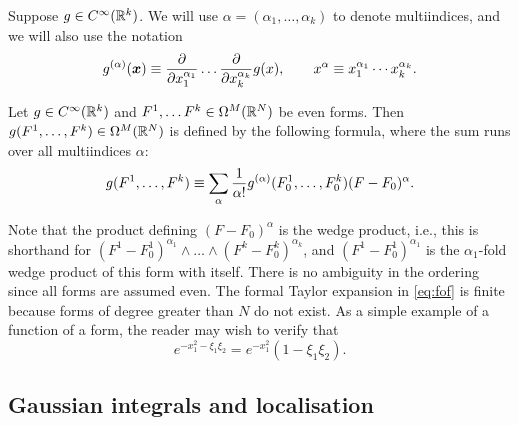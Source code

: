 \documentclass[11pt,a4paper]{article}
\begin{document}
Suppose $g\in C^{\infty}(\mathbb{R}^{k})$. We will use
$\alpha = (\alpha_{1},\dots,\alpha_{k})$ to denote multiindices,
and we will also use the notation
\begin{equation*}
  g^{(\alpha)}(\boldsymbol{x})
  \equiv \frac{\partial }{\partial x_1^{\alpha_{1}}}\dots
  \frac{\partial }{\partial x_k^{\alpha_{k}}}g(x), \qquad x^{\alpha} \equiv
  x_{1}^{\alpha_{1}}\cdots x_{k}^{\alpha_{k}}.
\end{equation*}
\begin{definition}
  Let $g \in C^\infty(\mathbb{R}^k)$ and $F^1, \dots F^k \in \Omega^M(\mathbb{R}^N)$
  be even forms. Then $g(F^1, \dots, F^k) \in\Omega^M(\mathbb{R}^N)$ is
  defined by the following formula, where the sum runs over all
  multiindices $\alpha$:
  \begin{equation}
    \label{eq:fof}
    g(F^1, \dots, F^k)
    \equiv \sum_{\alpha} \frac{1}{\alpha!} g^{(\alpha)}(F^1_0, \dots, F^k_0) (F-F_0)^\alpha.
  \end{equation}
\end{definition}
Note that the product defining $(F-F_{0})^{\alpha}$ is the wedge
product, i.e., this is shorthand for
$(F^{1}-F^{1}_{0})^{\alpha_{1}}\wedge \dots \wedge
(F^{k}-F^{k}_{0})^{\alpha_{k}}$, and $(F^{1}-F^{1}_{0})^{\alpha_{1}}$
is the $\alpha_{1}$-fold wedge product of this form with itself. There
is no ambiguity in the ordering since all forms are assumed even.  The
formal Taylor expansion in \eqref{eq:fof} is finite because forms of
degree greater than $N$ do not exist.  As a simple example of a
function of a form, the reader may wish to verify that
\begin{equation}
  e^{-x_1^2-\xi_1\xi_2} = e^{-x_1^2}(1-\xi_1\xi_2).
\end{equation}


\subsection{Gaussian integrals and localisation}
\end{document}
